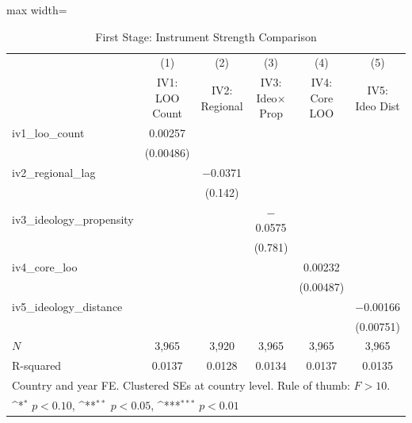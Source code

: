 \begin{table}[htbp]\centering
\def\sym#1{\ifmmode^{#1}\else\(^{#1}\)\fi}
\caption{First Stage: Instrument Strength Comparison}
\label{tab:ivcompare}
\begin{adjustbox}{max width=\textwidth}
\small
\begin{tabular}{l*{5}{c}}
\hline\hline
            &\multicolumn{1}{c}{(1)}&\multicolumn{1}{c}{(2)}&\multicolumn{1}{c}{(3)}&\multicolumn{1}{c}{(4)}&\multicolumn{1}{c}{(5)}\\
            &\multicolumn{1}{c}{IV1: LOO Count}&\multicolumn{1}{c}{IV2: Regional}&\multicolumn{1}{c}{IV3: Ideo$\times$Prop}&\multicolumn{1}{c}{IV4: Core LOO}&\multicolumn{1}{c}{IV5: Ideo Dist}\\
\hline
iv1\_loo\_count & 0.00257 & & & & \\
            & (0.00486) & & & & \\[0.5em]
iv2\_regional\_lag & & $-$0.0371 & & & \\
            & & (0.142) & & & \\[0.5em]
iv3\_ideology\_propensity & & & $-$0.0575 & & \\
            & & & (0.781) & & \\[0.5em]
iv4\_core\_loo & & & & 0.00232 & \\
            & & & & (0.00487) & \\[0.5em]
iv5\_ideology\_distance & & & & & $-$0.00166 \\
            & & & & & (0.00751) \\
\hline
\(N\)       & 3,965 & 3,920 & 3,965 & 3,965 & 3,965 \\
R-squared   & 0.0137 & 0.0128 & 0.0134 & 0.0137 & 0.0135 \\
\hline\hline
\multicolumn{6}{l}{\footnotesize Country and year FE. Clustered SEs at country level. Rule of thumb: $F > 10$.}\\
\multicolumn{6}{l}{\footnotesize \sym{*} \(p<0.10\), \sym{**} \(p<0.05\), \sym{***} \(p<0.01\)}\\
\end{tabular}
\end{adjustbox}
\end{table}
